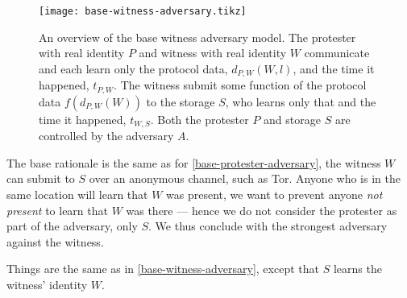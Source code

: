 \begin{figure}
  \centering
  \texttt{[image: base-witness-adversary.tikz]}
  \caption{\label{fig:witness-adversary}%
    An overview of the base witness adversary model.
    The protester with real identity \(P\) and witness with real identity \(W\) 
    communicate and each learn only the protocol data, \(d_{P,W}(W, l)\), and 
    the time it happened, \(t_{P,W}\).
    The witness submit some function of the protocol data \(f(d_{P,W}(W))\) to 
    the storage \(S\), who learns only that and the time it happened, 
    \(t_{W,S}\).
    Both the protester \(P\) and storage \(S\) are controlled by the adversary 
    \(A\).
  }
\end{figure}

The base rationale is the same as for \cref{base-protester-adversary}, the 
witness \(W\) can submit to \(S\) over an anonymous channel, such as \ac{Tor}.
Anyone who is in the same location will learn that \(W\) was present, we want 
to prevent anyone \emph{not present} to learn that \(W\) was there --- hence we 
do not consider the protester as part of the adversary, only \(S\).
We thus conclude with the strongest adversary against the witness.

\begin{definition}%
  \label{strongest-witness-adversary}
  Things are the same as in \cref{base-witness-adversary}, except that \(S\) 
  learns the witness' identity \(W\).
\end{definition}
